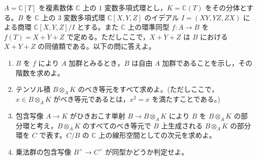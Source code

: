 \documentclass[12pt]{jlreq}
\begin{document}
$A = \mathbb{C}[T]$ を複素数体 $\mathbb{C}$ 上の $1$ 変数多項式環とし，$K = \mathbb{C}(T)$ をその分体とする。$B$ を $\mathbb{C}$ 上の $3$ 変数多項式環 $\mathbb{C}[X,Y,Z]$ のイデアル $I = (XY, YZ, ZX)$ による商環 $\mathbb{C}[X,Y,Z]/I$ とする。また $\mathbb{C}$ 上の環準同型 $f: A \to B$ を $f(T) = \overline{X+Y+Z}$ で定める。ただしここで，$\overline{X+Y+Z}$ は $B$ における $X+Y+Z$ の同値類である。以下の問に答えよ。

\begin{enumerate}
  \item $B$ を $f$ により $A$ 加群とみるとき，$B$ は自由 $A$ 加群であることを示し，その階数を求めよ。
  \item テンソル積 $B \otimes_A K$ のべき等元をすべて求めよ。(ただしここで，$x \in B \otimes_A K$ がべき等元であるとは，$x^2 = x$ を満たすことである。)
  \item 包含写像 $A \to K$ がひきおこす単射 $B \to B \otimes_A K$ により $B$ を $B \otimes_A K$ の部分環と考え，$B \otimes_A K$ のすべてのべき等元で $B$ 上生成される $B \otimes_A K$ の部分環を $C$ で表す。$C/B$ の $\mathbb{C}$ 上の線形空間としての次元を求めよ。
  \item 乗法群の包含写像 $B^\times \to C^\times$ が同型かどうか判定せよ。
\end{enumerate}
\end{document}
